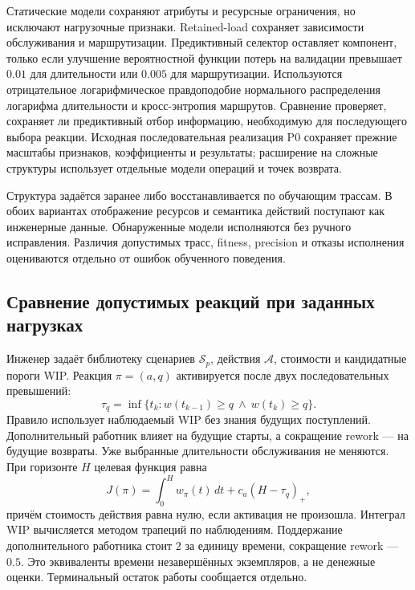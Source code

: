 Статические модели сохраняют атрибуты и ресурсные ограничения, но исключают нагрузочные признаки. Retained-load сохраняет зависимости обслуживания и маршрутизации. Предиктивный селектор оставляет компонент, только если улучшение вероятностной функции потерь на валидации превышает $0.01$ для длительности или $0.005$ для маршрутизации. Используются отрицательное логарифмическое правдоподобие нормального распределения логарифма длительности и кросс-энтропия маршрутов. Сравнение проверяет, сохраняет ли предиктивный отбор информацию, необходимую для последующего выбора реакции. Исходная последовательная реализация P0 сохраняет прежние масштабы признаков, коэффициенты и результаты; расширение на сложные структуры использует отдельные модели операций и точек возврата.

Структура задаётся заранее либо восстанавливается по обучающим трассам. В обоих вариантах отображение ресурсов и семантика действий поступают как инженерные данные. Обнаруженные модели исполняются без ручного исправления. Различия допустимых трасс, fitness, precision и отказы исполнения оцениваются отдельно от ошибок обученного поведения.

\subsection{Сравнение допустимых реакций при заданных нагрузках}
Инженер задаёт библиотеку сценариев $\mathcal S_p$, действия $\mathcal A$, стоимости и кандидатные пороги WIP. Реакция $\pi=(a,q)$ активируется после двух последовательных превышений:
\begin{equation}\label{eq:trigger}
\tau_q=\inf\{t_k:w(t_{k-1})\geq q\ \land\ w(t_k)\geq q\}.
\end{equation}
Правило использует наблюдаемый WIP без знания будущих поступлений. Дополнительный работник влияет на будущие старты, а сокращение rework — на будущие возвраты. Уже выбранные длительности обслуживания не меняются. При горизонте $H$ целевая функция равна
\begin{equation}\label{eq:cost}
J(\pi)=\int_0^H w_\pi(t)\,dt+c_a(H-\tau_q)_+,
\end{equation}
причём стоимость действия равна нулю, если активация не произошла. Интеграл WIP вычисляется методом трапеций по наблюдениям. Поддержание дополнительного работника стоит $2$ за единицу времени, сокращение rework — $0.5$. Это эквиваленты времени незавершённых экземпляров, а не денежные оценки. Терминальный остаток работы сообщается отдельно.

